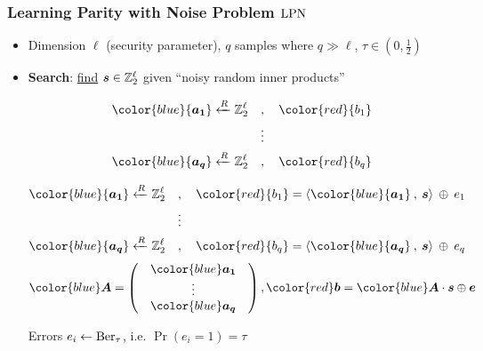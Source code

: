 \begin{frame}
\frametitle{Learning Parity with Noise Problem $\mathrm{LPN}$}
\begin{itemize}[<+->]
 \item Dimension $\ell$ (security parameter), $q$ samples where $q \gg \ell$, $\tau \in \left( 0,\frac{1}{2} \right)$
 \vspace*{5pt}
 \item \textbf{Search}: \underline{find}  $ \boldsymbol{s} \in \mathbb{Z}_2^{\ell}$ given ``noisy random inner products'' \\
 \begin{overprint}
  \begin{align*}
  {\color{blue}{\vect{a_1}}} \R \zol \quad &, \quad {\color{red}{b_1}}    \\
   & \vdots \\
   {\color{blue}{\vect{a_q}}} \R \zol \quad &, \quad  {\color{red}{b_q}}    \\
  \end{align*}


  \begin{align*}
  {\color{blue}{\vect{a_1}}} \R \zol \quad &, \quad {\color{red}{b_1}} = \langle {\color{blue}{\vect{a_1}}} \: , \: \vect{s} \rangle \: \xor \: e_1 \\
   & \vdots \\
   {\color{blue}{\vect{a_q}}} \R \zol \quad &, \quad  {\color{red}{b_q}} = \langle {\color{blue}{\vect{a_q}}} \: , \: \vect{s} \rangle \: \xor \: e_q \\
  \end{align*}
  \vspace*{15pt}
\[
{\color{blue} \vect{A}} = \begin{pmatrix}
            & {\color{blue}\vect{a_1}} & \\
            & \vdots  & \\ 
            & {\color{blue}\vect{a_q}} & 
           \end{pmatrix}  , {\color{red} \vect{b}} = {\color{blue} \vect{A}} \cdot \vect{s} \xor \vect{e} 
\]
 \end{overprint}
 Errors $e_i \gets \mathrm{Ber}_{\tau}$, i.e. $\Pr(e_i=1)= \tau$


\end{itemize}
\end{frame}

